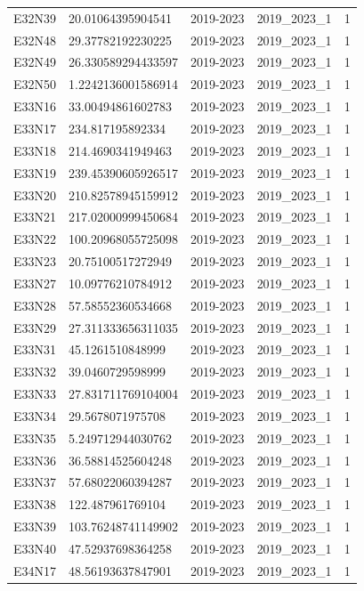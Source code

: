 \begin{landscape}
\begin{longtable}{lllll}
E32N39 & 20.01064395904541 & 2019-2023 & 2019\_2023\_1 & 1 \\
E32N48 & 29.37782192230225 & 2019-2023 & 2019\_2023\_1 & 1 \\
E32N49 & 26.330589294433597 & 2019-2023 & 2019\_2023\_1 & 1 \\
E32N50 & 1.2242136001586914 & 2019-2023 & 2019\_2023\_1 & 1 \\
E33N16 & 33.00494861602783 & 2019-2023 & 2019\_2023\_1 & 1 \\
E33N17 & 234.817195892334 & 2019-2023 & 2019\_2023\_1 & 1 \\
E33N18 & 214.4690341949463 & 2019-2023 & 2019\_2023\_1 & 1 \\
E33N19 & 239.45390605926517 & 2019-2023 & 2019\_2023\_1 & 1 \\
E33N20 & 210.82578945159912 & 2019-2023 & 2019\_2023\_1 & 1 \\
E33N21 & 217.02000999450684 & 2019-2023 & 2019\_2023\_1 & 1 \\
E33N22 & 100.20968055725098 & 2019-2023 & 2019\_2023\_1 & 1 \\
E33N23 & 20.75100517272949 & 2019-2023 & 2019\_2023\_1 & 1 \\
E33N27 & 10.09776210784912 & 2019-2023 & 2019\_2023\_1 & 1 \\
E33N28 & 57.58552360534668 & 2019-2023 & 2019\_2023\_1 & 1 \\
E33N29 & 27.311333656311035 & 2019-2023 & 2019\_2023\_1 & 1 \\
E33N31 & 45.1261510848999 & 2019-2023 & 2019\_2023\_1 & 1 \\
E33N32 & 39.0460729598999 & 2019-2023 & 2019\_2023\_1 & 1 \\
E33N33 & 27.831711769104004 & 2019-2023 & 2019\_2023\_1 & 1 \\
E33N34 & 29.5678071975708 & 2019-2023 & 2019\_2023\_1 & 1 \\
E33N35 & 5.249712944030762 & 2019-2023 & 2019\_2023\_1 & 1 \\
E33N36 & 36.58814525604248 & 2019-2023 & 2019\_2023\_1 & 1 \\
E33N37 & 57.68022060394287 & 2019-2023 & 2019\_2023\_1 & 1 \\
E33N38 & 122.487961769104 & 2019-2023 & 2019\_2023\_1 & 1 \\
E33N39 & 103.76248741149902 & 2019-2023 & 2019\_2023\_1 & 1 \\
E33N40 & 47.52937698364258 & 2019-2023 & 2019\_2023\_1 & 1 \\
E34N17 & 48.56193637847901 & 2019-2023 & 2019\_2023\_1 & 1 \\

\end{longtable}
\end{landscape}
